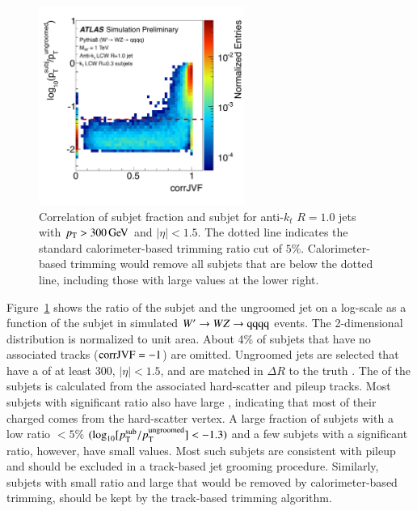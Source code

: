 \documentclass{atlasnote}
\begin{document}
\begin{figure}[!htbp]
  \centering
  \includegraphics[width= 0.6\textwidth]{TrackBasedTrimming_CorrJVF_vs_pTratio_fCutline}
  \caption{Correlation of subjet \pT fraction and subjet \cJVF for anti-$k_t$ $R=1.0$ jets with $p_{\mathrm{T}}>300\,\text{Ge\hspace{-.08em}V}$ and $|\eta| <1.5$. 
The dotted line indicates the standard calorimeter-based trimming \pT ratio cut of $5\%$. Calorimeter-based trimming would remove all subjets
that are below the dotted line, including those with large \cJVF values at the lower right.}
  \label{fig:TrackBasedTrimming_Correlation}
\end{figure}
Figure~\ref{fig:TrackBasedTrimming_Correlation} shows the ratio of the subjet \pT and the ungroomed jet \pT 
on a log-scale as a function of the subjet \cJVF in simulated $W^{\prime} \rightarrow W Z \rightarrow {\mathrm{q}}{\mathrm{q}}{\mathrm{q}}{\mathrm{q}}$ events. 
The 2-dimensional distribution is normalized to unit area. About 4\% of subjets that have no associated tracks (${\rm corrJVF}=-1$) are omitted. 
Ungroomed jets are selected that have a \pT of at least 300\GeV, $|\eta| <1.5$, and are matched in $\Delta R$ to the truth \Zboson. 
The \cJVF of the subjets is calculated from the associated hard-scatter and pileup tracks. Most subjets with significant \pT ratio 
also have large \cJVF, 
indicating that most of their charged \pT comes from the hard-scatter vertex. A large fraction of subjets with a low \pT 
ratio $< 5\%$ $(\log_{10}[p_{\mathrm{T}}^{\rm sub}/p_{\mathrm{T}}^{\rm ungroomed}] <-1.3)$ and a few subjets with a significant \pT ratio, 
however, have small \cJVF values. Most such subjets are consistent with pileup and should be excluded in a track-based jet grooming procedure. 
Similarly, subjets with small \pT ratio and large \cJVF that would be removed by calorimeter-based trimming, should be kept by the track-based 
trimming algorithm. 
\end{document}
